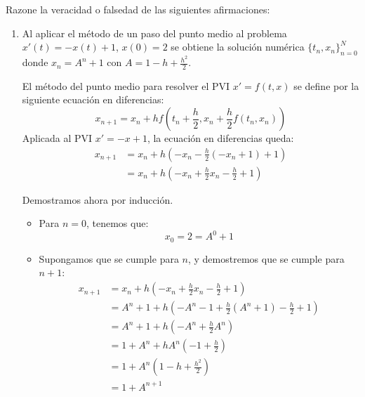 \begin{ejercicio}\label{ej:3.1.6}
    Razone la veracidad o falsedad de las siguientes afirmaciones:
    \begin{enumerate}
        \item Al aplicar el método de un paso del punto medio al problema $x'(t) = -x(t) + 1$, $x(0) = 2$ se obtiene la solución numérica $\{t_n, x_n\}_{n=0}^N$ donde $x_n = A^n + 1$ con $A = 1 - h + \frac{h^2}{2}$.
        
        El método del punto medio para resolver el PVI $x' = f(t, x)$ se define por la siguiente ecuación en diferencias:
        \begin{equation*}
            x_{n+1} = x_n + h f\left(t_n + \frac{h}{2}, x_n + \frac{h}{2} f(t_n, x_n)\right)
        \end{equation*}
        Aplicada al PVI $x' = -x + 1$, la ecuación en diferencias queda:
        \begin{align*}
            x_{n+1} &= x_n + h\left(-x_n - \frac{h}{2}(-x_n + 1)+1\right) \\
            &= x_n + h\left(-x_n + \frac{h}{2} x_n - \frac{h}{2} + 1\right)
        \end{align*}

        Demostramos ahora por inducción.
        \begin{itemize}
            \item Para $n=0$, tenemos que:
            \begin{equation*}
                x_0 = 2 = A^0 + 1
            \end{equation*}

            \item Supongamos que se cumple para $n$, y demostremos que se cumple para $n+1$:
            \begin{align*}
                x_{n+1} &= x_n + h\left(-x_n + \frac{h}{2} x_n - \frac{h}{2} + 1\right) \\
                &= A^n + 1 + h\left(-A^n - 1 + \frac{h}{2} (A^n+1) - \frac{h}{2} + 1\right) \\
                &= A^n + 1 + h\left(-A^n + \frac{h}{2} A^n\right) \\
                &= 1 + A^n + hA^n\left(-1 + \frac{h}{2}\right) \\
                &= 1 + A^n\left(1 - h + \frac{h^2}{2}\right) \\
                &= 1 + A^{n+1}
            \end{align*}


\end{itemize}
\end{enumerate}
\end{ejercicio}
